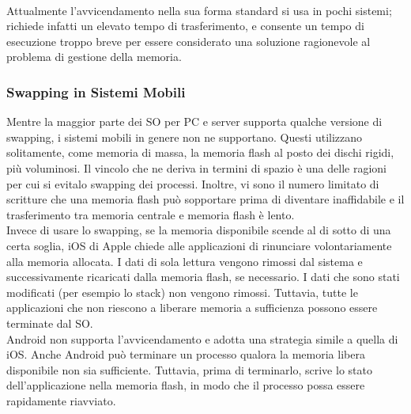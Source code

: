 \documentclass{article}
\begin{document}
				\\Attualmente l’avvicendamento nella sua forma standard si usa in pochi sistemi; richiede infatti un elevato tempo di trasferimento, e consente un tempo di esecuzione troppo breve per essere considerato una soluzione ragionevole al problema di gestione della memoria.

			\subsubsection{Swapping in Sistemi Mobili}
				Mentre la maggior parte dei SO per PC e server supporta qualche versione di swapping, i sistemi mobili in genere non ne supportano. Questi utilizzano solitamente, come memoria di massa, la memoria flash al posto dei dischi rigidi, più voluminosi. Il vincolo che ne deriva in termini di spazio è una delle ragioni per cui si evitalo swapping dei processi. Inoltre, vi sono il numero limitato di scritture che una memoria flash può sopportare prima di diventare inaffidabile e il trasferimento tra memoria centrale e memoria flash è lento.
				\\Invece di usare lo swapping, se la memoria disponibile scende al di sotto di una certa soglia, iOS di Apple chiede alle applicazioni di rinunciare volontariamente alla memoria allocata. I dati di sola lettura vengono rimossi dal sistema e successivamente ricaricati dalla memoria flash, se necessario. I dati che sono stati modificati (per esempio lo stack) non vengono rimossi. Tuttavia, tutte le applicazioni che non riescono a liberare memoria a sufficienza possono essere terminate dal SO.
				\\Android non supporta l’avvicendamento e adotta una strategia simile a quella di iOS. Anche Android può terminare un processo qualora la memoria libera disponibile non sia sufficiente. Tuttavia, prima di terminarlo, scrive lo stato dell’applicazione nella memoria flash, in modo che il processo possa essere rapidamente riavviato.
		
\end{document}

